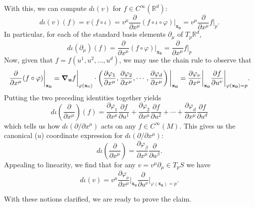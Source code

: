 \documentclass{article}
\theoremstyle{definition}
\newcommand{\p}{\partial}
\newcommand{\R}{\mathbb{R}}
\newcommand{\f}[2]{\frac{#1}{#2}}
\theoremstyle{theorem}
\begin{document}
With this, we can compute $d\iota(v)$ for $f\in C^{\infty}(\R^d)$:
\begin{equation*}
d\iota(v)(f) =v(f\circ\iota)=v^{\mu}\frac{\partial}{\partial x^{\mu}}(f\circ\iota\circ\varphi)\bigg\vert_{\mathbf{x_0}}
=v^\mu\frac{\partial}{\partial x^{\mu}} f \bigg\vert_{p}.
\end{equation*}
In particular, for each of the standard basis elements $\p_\mu$ of $T_p\R^d$,
\begin{equation*}
d\iota(\partial_\mu)(f)=\frac{\partial}{\partial x^{\mu}}(f\circ\varphi)\bigg\vert_{\mathbf{x_0}} = \f{\p}{\p x^\mu} f \bigg\vert_{p}
\end{equation*}
Now, given that $f=f(u^1,u^2,\dots,u^d)$, we may use the chain rule to observe that
\begin{equation*}
\frac{\partial}{\partial x^{\mu}}(f\circ\varphi)\bigg\vert_{\mathbf{x_0}}=\grad_\mathbf{u}f\bigg\vert_{\varphi(\mathbf{x}_0)}\cdot\left(\frac{\partial\varphi_1}{\partial x^{\mu}},\frac{\partial\varphi_2}{\partial x^{\mu}},\cdots,\frac{\partial\varphi_d}{\partial x^{\mu}}\right)\bigg\vert_{\mathbf{x_0}}
= \f{\p \varphi_\nu}{\p x^\mu}\bigg\vert_{\mathbf{x_0}} \f{\p f}{\p u^\nu}\bigg\vert_{\varphi(\mathbf{x_0}) = p}.
\end{equation*}
Putting the two preceding identities together yields
\begin{equation*}
d\iota\left(\frac{\partial}{\partial x^\mu}\right)(f) =\frac{\partial\varphi_1}{\partial x^{\mu}}\frac{\partial f}{\partial u^1}+\frac{\partial\varphi_2}{\partial x^{\mu}}\frac{\partial f}{\partial u^2}+\cdots+\frac{\partial\varphi_d}{\partial x^{\mu}}\frac{\partial f}{\partial u^d}
\end{equation*}
which tells us how $d\iota(\partial/\partial x^\mu)$ acts on any $f\in C^{\infty}(M)$. This gives us the canonical ($u$) coordinate expression for $d\iota(\partial/\partial x^{\mu})$:
\begin{equation*}
d\iota\left(\frac{\partial}{\partial x^{\mu}}\right)=\frac{\partial\varphi_\beta}{\partial x^{\mu}}\frac{\partial}{\partial u^\beta}.
\end{equation*}
Appealing to linearity, we find that for any $v = v^\mu \p_\mu \in T_p S$ we have
\begin{equation*}
d\iota(v)= v^\mu\f{\p \varphi_\nu}{\p x^\mu}\bigg\vert_{\mathbf{x_0}} \f{\p }{\p u^\nu}\bigg\vert_{\varphi(\mathbf{x_0}) = p}.
\end{equation*}

With these notions clarified, we are ready to prove the claim.
\end{document}
